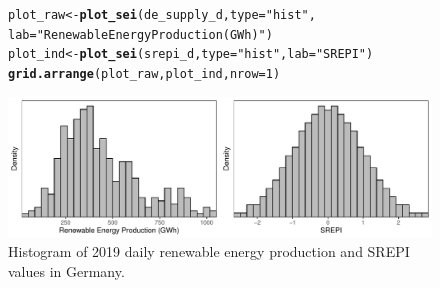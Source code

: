 \documentclass[article,shortnames,nojss]{jss}\usepackage[]{graphicx}\usepackage[]{xcolor}
\makeatletter
\newcommand{\hlnum}[1]{\textcolor[rgb]{0.686,0.059,0.569}{#1}}%
\newcommand{\hlstr}[1]{\textcolor[rgb]{0.192,0.494,0.8}{#1}}%
\newcommand{\hlstd}[1]{\textcolor[rgb]{0.345,0.345,0.345}{#1}}%
\newcommand{\hlkwb}[1]{\textcolor[rgb]{0.69,0.353,0.396}{#1}}%
\newcommand{\hlkwc}[1]{\textcolor[rgb]{0.333,0.667,0.333}{#1}}%
\newcommand{\hlkwd}[1]{\textcolor[rgb]{0.737,0.353,0.396}{\textbf{#1}}}%
\newenvironment{kframe}{%
 \def\at@end@of@kframe{}%
 \ifinner\ifhmode%
  \def\at@end@of@kframe{\end{minipage}}%
  \begin{minipage}{\columnwidth}%
 \fi\fi%
 \def\FrameCommand##1{\hskip\@totalleftmargin \hskip-\fboxsep
 \colorbox{shadecolor}{##1}\hskip-\fboxsep
     \hskip-\linewidth \hskip-\@totalleftmargin \hskip\columnwidth}%
 \MakeFramed {\advance\hsize-\width
   \@totalleftmargin\z@ \linewidth\hsize
   \@setminipage}}%
 {\par\unskip\endMakeFramed%
 \at@end@of@kframe}
\newenvironment{knitrout}{}{} %
\makeatother
\begin{document}
\begin{figure}
\begin{knitrout}
\color{fgcolor}\begin{kframe}
\begin{alltt}
\hlstd{plot_raw} \hlkwb{<-} \hlkwd{plot_sei}\hlstd{(de_supply_d,} \hlkwc{type} \hlstd{=} \hlstr{"hist"}\hlstd{,}
                     \hlkwc{lab} \hlstd{=} \hlstr{"Renewable Energy Production (GWh)"}\hlstd{)}
\hlstd{plot_ind} \hlkwb{<-} \hlkwd{plot_sei}\hlstd{(srepi_d,} \hlkwc{type} \hlstd{=} \hlstr{"hist"}\hlstd{,} \hlkwc{lab} \hlstd{=} \hlstr{"SREPI"}\hlstd{)}
\hlkwd{grid.arrange}\hlstd{(plot_raw, plot_ind,} \hlkwc{nrow} \hlstd{=} \hlnum{1}\hlstd{)}
\end{alltt}
\end{kframe}

{\centering \includegraphics[width=\linewidth]{figure/plot_dist-1} 

}


\end{knitrout}
\caption{Histogram of 2019 daily renewable energy production and SREPI values in Germany.}
\label{fig:dist_raw}
\end{figure}
\end{document}
